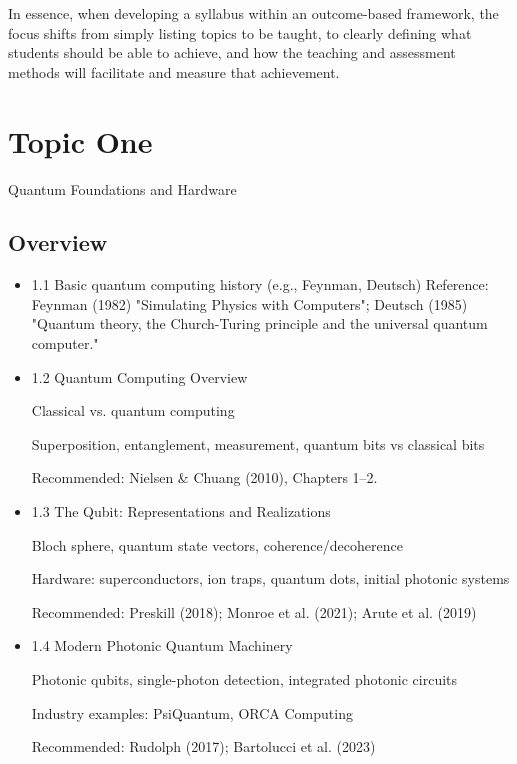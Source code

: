 \documentclass[11pt,a4paper]{article}
\begin{document}
	In essence, when developing a syllabus within an outcome-based framework, the focus shifts from simply listing topics to be taught, to clearly defining what students should be able to achieve, and how the teaching and assessment methods will facilitate and measure that achievement.
	
\section{Topic One}

Quantum Foundations and Hardware

\subsection{Overview}

	\begin{itemize} 

	\item 1.1 Basic quantum computing history (e.g., Feynman, Deutsch)
Reference: Feynman (1982) "Simulating Physics with Computers"; Deutsch (1985) "Quantum theory, the Church-Turing principle and the universal quantum computer."

	\item 1.2 Quantum Computing Overview

	Classical vs. quantum computing
	
	Superposition, entanglement, measurement, quantum bits vs classical bits
	
	Recommended: Nielsen \& Chuang (2010), Chapters 1–2.

	\item 1.3 The Qubit: Representations and Realizations

	Bloch sphere, quantum state vectors, coherence/decoherence
	
	Hardware: superconductors, ion traps, quantum dots, initial photonic systems
	
	Recommended: Preskill (2018); Monroe et al. (2021); Arute et al. (2019)
	
	\item 1.4 Modern Photonic Quantum Machinery

	Photonic qubits, single-photon detection, integrated photonic circuits
	
	Industry examples: PsiQuantum, ORCA Computing
	
	Recommended: Rudolph (2017); Bartolucci et al. (2023)

\end{itemize}
\end{document}
